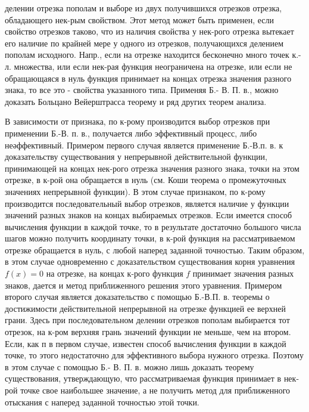 \documentclass[10pt]{article}
\begin{document}
делении отрезка пополам и выборе из двух получившихся отрезков отрезка, обладающего нек-рым свойством. Этот метод может быть применен, если свойство отрезков таково, что из наличия свойства у нек-рого отрезка вытекает его наличие по крайней мере у одного из отрезков, получающихся делением пополам исходного. Напр., если на отрезке находится бесконечно много точек к.-л. множества, или если нек-рая функция неограничена на отрезке, или если не обращающаяся в нуль функция принимает на концах отрезка значения разного знака, то все это - свойства указанного типа. Применяя Б.- В. П. в., можно доказать Больцано Вейерштрасса теорему и ряд других теорем анализа.



В зависимости от признака, по к-рому производится выбор отрезков при применении Б.-В. п. в., получается либо эффективный процесс, либо неәффективный. Примером первого случая является применение Б.-В.п. в. к доказательству существования у непрерывной действительной функции, принимающей на концах нек-рого отрезка значения разного знака, точки на этом отрезке, в к-рой она обращается в нуль (см. Коши теорема о промежуточных значениях непрерывной функции). В этом случае признаком, по к-рому производится последовательный выбор отрезков, является наличие у функции значений разных знаков на концах выбираемых отрезков. Если имеется способ вычисления функции в каждой точке, то в результате достаточно большого числа шагов можно получить координату точки, в к-рой функция на рассматриваемом отрезке обращается в нуль, с любой наперед заданной точностью. Таким образом, в этом случае одновременно с доказательством существования корня уравнения $f(x)=0$ на отрезке, на концах к-рого функция $f$ принимает значения разных знаков, дается и метод приближенного решения этого уравнения. Примером второго случая является доказательство с помощью Б.-В.П. в. теоремы о достижимости действительной непрерывной на отрезке функцией ее верхней грани. Здесь при последовательном делении отрезков пополам выбирается тот отрезок, на к-ром верхняя грань значений функции не меньше, чем на втором. Если, как п в первом случае, известен способ вычисления функции в каждой точке, то этого недостаточно для эффективного выбора нужного отрезка. Поэтому в этом случае с помощью Б.- В. П. в. можно лишь доказать теорему существования, утверждающую, что рассматриваемая функция принимает в нек-рой точке свое наибольшее значение, а не получить метод для приближенного отыскания с наперед заданной точностью этой точки.
\end{document}
